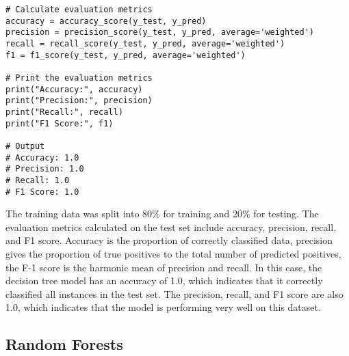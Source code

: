 \documentclass{article}[12pt]
\theoremstyle{definition}
\begin{document}
\bigskip

\begin{verbatim}
# Calculate evaluation metrics
accuracy = accuracy_score(y_test, y_pred)
precision = precision_score(y_test, y_pred, average='weighted')
recall = recall_score(y_test, y_pred, average='weighted')
f1 = f1_score(y_test, y_pred, average='weighted')

# Print the evaluation metrics
print("Accuracy:", accuracy)
print("Precision:", precision)
print("Recall:", recall)
print("F1 Score:", f1)

# Output
# Accuracy: 1.0
# Precision: 1.0
# Recall: 1.0
# F1 Score: 1.0
\end{verbatim}

\bigskip

\noindent
The training data was split into 80\% for training and 20\% for testing. The evaluation metrics calculated on the test set include accuracy, precision, recall, and F1 score. Accuracy is the proportion of correctly classified data, precision gives the proportion of true positives to the total number of predicted positives, the F-1 score is the harmonic mean of precision and recall. In this case, the decision tree model has an accuracy of 1.0, which indicates that it correctly classified all instances in the test set. The precision, recall, and F1 score are also 1.0, which indicates that the model is performing very well on this dataset.

\newpage

\subsection{Random Forests}

\bigskip
\end{document}
